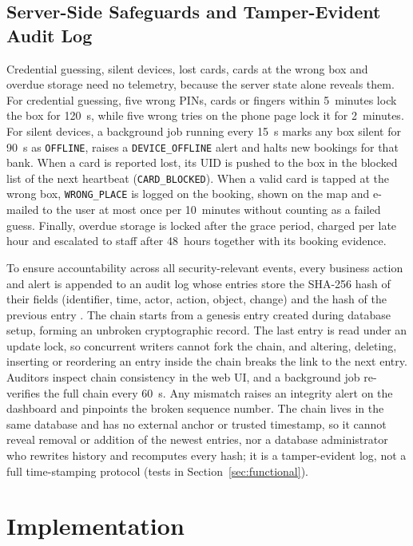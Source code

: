 \documentclass[journal,onecolumn]{IEEEtran}
\begin{document}
\subsection{Server-Side Safeguards and Tamper-Evident Audit Log}

Credential guessing, silent devices, lost cards, cards at the wrong box and overdue storage need no telemetry, because
the server state alone reveals them. For credential guessing, five wrong PINs, cards or fingers within 5~minutes lock
the box for 120~s, while five wrong tries on the phone page lock it for 2~minutes. For silent devices, a background job
running every 15~s marks any box silent for 90~s as \texttt{OFFLINE}, raises a \texttt{DEVICE\_OFFLINE} alert and halts
new bookings for that bank. When a card is reported lost, its UID is pushed to the box in the blocked list of the next
heartbeat (\texttt{CARD\_BLOCKED}). When a valid card is tapped at the wrong box, \texttt{WRONG\_PLACE} is logged on the
booking, shown on the map and e-mailed to the user at most once per 10~minutes without counting as a failed guess.
Finally, overdue storage is locked after the grace period, charged per late hour and escalated to staff after 48~hours
together with its booking evidence.

To ensure accountability across all security-relevant events, every business action and alert is appended to an audit log
whose entries store the SHA-256 hash of their fields (identifier, time, actor, action, object, change) and the hash of the
previous entry \cite{haber1991timestamp}. The chain starts from a genesis entry created during database setup, forming an
unbroken cryptographic record. The last entry is read under an update lock, so concurrent writers cannot fork the chain, and
altering, deleting, inserting or reordering an entry inside the chain breaks the link to the next entry. Auditors inspect
chain consistency in the web UI, and a background job re-verifies the full chain every 60~s. Any mismatch raises an
integrity alert on the dashboard and pinpoints the broken sequence number. The chain lives in the same database and has
no external anchor or trusted timestamp, so it cannot reveal removal or addition of the newest entries, nor a database
administrator who rewrites history and recomputes every hash; it is a tamper-evident log, not a full time-stamping
protocol (tests in Section~\ref{sec:functional}).

\section{Implementation}
\end{document}

